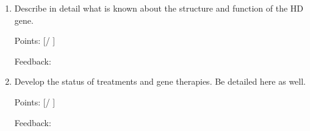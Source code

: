 \documentclass[plain,basic]{inVerba-notes}
\begin{document}
{\begin{enumerate}
\begin{enumerate}
    Points: [\qquad / \qquad ]

    Feedback: 

    \vspace*{50pt}
    \item Describe in detail what is known about the structure and function of the HD gene.
    
    \basec{
      
    }

    Points: [\qquad / \qquad ]

    Feedback: 

    \vspace*{50pt}
    \item Develop the status of treatments and gene therapies. Be detailed here as well.
    
    \basec{
      
    }

    Points: [\qquad / \qquad ]

    Feedback: 

    \vspace*{50pt}
  \end{enumerate}

 \end{enumerate}}


\nocite*{}


\end{document}
